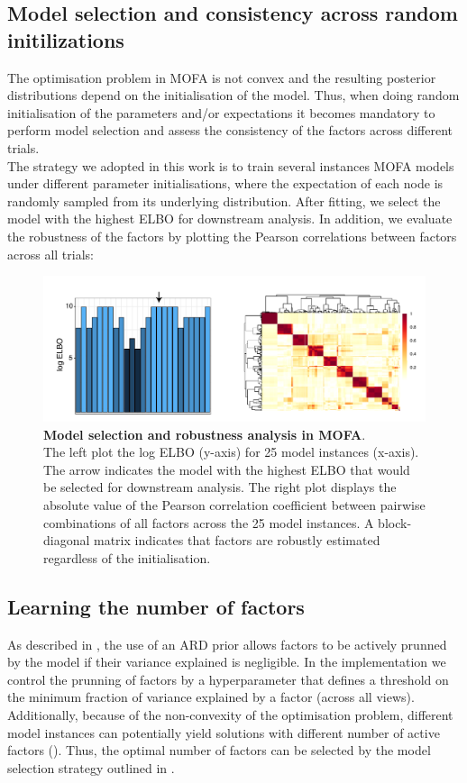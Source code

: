 \subsection{Model selection and consistency across random initilizations} \label{section:mofa_robustness}
The optimisation problem in MOFA is not convex and the resulting posterior distributions depend on the initialisation of the model. Thus, when doing random initialisation of the parameters and/or expectations it becomes mandatory to perform model selection and assess the consistency of the factors across different trials.\\
The strategy we adopted in this work is to train several instances MOFA models under different parameter initialisations, where the expectation of each node is randomly sampled from its underlying distribution. After fitting, we select the model with the highest ELBO for downstream analysis. In addition, we evaluate the robustness of the factors by plotting the Pearson correlations between factors across all trials:

\begin{figure}[H]
	\centering 	
	\includegraphics[width=1.0\textwidth]{MOFA_robustness}
	\caption{ \textbf{Model selection and robustness analysis in MOFA}.\\
	The left plot the log ELBO (y-axis) for 25 model instances (x-axis). The arrow indicates the model with the highest ELBO that would be selected for downstream analysis. The right plot displays the absolute value of the Pearson correlation coefficient between pairwise combinations of all factors across the 25 model instances. A block-diagonal matrix indicates that factors are robustly estimated regardless of the initialisation.}
	\label{fig:MOFA_robustness}
\end{figure}

\subsection{Learning the number of factors} \label{section:mofa_nfactors}
As described in , the use of an ARD prior allows factors to be actively prunned by the model if their variance explained is negligible. In the implementation we control the prunning of factors by a hyperparameter that defines a threshold on the minimum fraction of variance explained by a factor (across all views).\\
Additionally, because of the non-convexity of the optimisation problem, different model instances can potentially yield solutions with different number of active factors (). Thus, the optimal number of factors can be selected by the model selection strategy outlined in .

